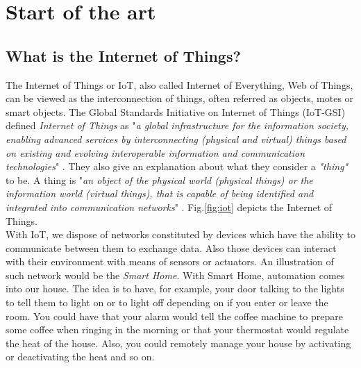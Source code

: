 \part{Start of the art} \label{part:state_art}

\chapter{What is the Internet of Things?}

The Internet of Things or IoT, also called Internet of Everything, Web of Things, can be viewed as the interconnection of things, often referred as objects, motes or smart objects. The Global Standards Initiative on Internet of Things (IoT-GSI) defined \textit{Internet of Things} as "\textit{a global infrastructure for the information society, enabling advanced services by interconnecting (physical and virtual) things based on existing and evolving interoperable information and communication technologies}" \cite{ituitu}. They also give an explanation about what they consider a \textit{"thing"} to be. A thing is "\textit{an object of the physical world (physical things) or the information world (virtual things), that is capable of being identified and integrated into communication networks}" \cite{ituitu}. Fig.\ref{fig:iot} depicts the Internet of Things.\\

With IoT, we dispose of networks constituted by devices which have the ability to communicate between them to exchange data. Also those devices can interact with their environment with means of sensors or actuators. An illustration of such network would be the \textit{Smart Home}. With Smart Home, automation comes into our house. The idea is to have, for example, your door talking to the lights to tell them to light on or to light off depending on if you enter or leave the room. You could have that your alarm would tell the coffee machine to prepare some coffee when ringing in the morning or that your thermostat would regulate the heat of the house. Also, you could remotely manage your house by activating or deactivating the heat and so on. \\

